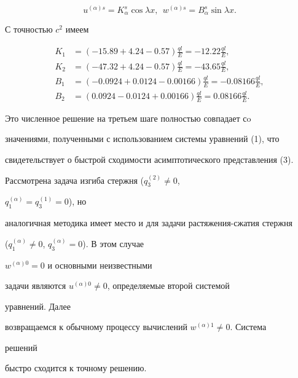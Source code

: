 $$ 


u^{(\alpha)s}=K^s_\alpha\cos\lambda x, 


\ \ w^{(\alpha)s}=B^s_\alpha\sin\lambda x. 


$$ 


С точностью $c^2$ имеем 


\begin{align*} 


K_1&=(-15.89+4.24-0.57)\frac{q l}{E}=-12.22\frac{q l}{E},\\ 


% 


K_2&=(-47.32+4.24-0.57)\frac{q l}{E}=-43.65\frac{q l}{E},\\ 


% 


B_1&=(-0.0924+0.0124-0.00166)\frac{q l}{E}=-0.08166


\frac{q l}{E},\\ 


% 


B_2&=(0.0924-0.0124+0.00166)\frac{q l}{E}=0.08166


\frac{q l}{E}. 


\end{align*} 


 


Это численное решение на третьем шаге полностью совпадает сo 


значениями, полученными с использованием системы уравнений (1), что 


свидетельствует о быстрой сходимости асимптотического представления (3). 


 


Рассмотрена задача изгиба стержня ($q^{(2)}_3\ne0$, 


$q^{(\alpha)}_1=q^{(1)}_3=0$), но 


аналогичная методика имеет место и для задачи растяжения-сжатия стержня 


($q^{(\alpha)}_1\ne0$, $q^{(\alpha)}_3=0$). В этом случае 


$w^{(\alpha)0}=0$ и основными неизвестными 


задачи являются $u^{(\alpha)0}\ne0$, определяемые второй системой 


уравнений. Далее 


возвращаемся к обычному процессу вычислений $w^{(\alpha)1}\ne0$. Система 


решений 


быстро сходится к точному решению. 


